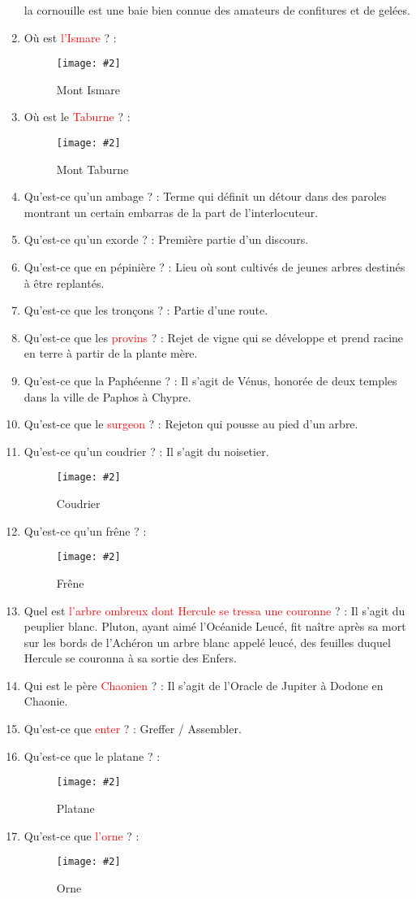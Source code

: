 \documentclass[a4paper, 11pt, hidelinks]{article}
\newcommand{\img}[4]{\begin{figure}[!ht]
    \centering
    \texttt{[image: \#2]}
    \caption{#3}
    \label{#4}
    \end{figure} }
\begin{document}
\begin{enumerate}
            la cornouille est une baie bien connue des amateurs de confitures et de gelées.
      \item Où est \textcolor{red}{l'Ismare} ? :
            \img{0.3}{Ismare.png}{Mont Ismare}{56}
      \item Où est le \textcolor{red}{Taburne} ? :
            \img{0.3}{Taburne.png}{Mont Taburne}{57}
      \item Qu'est-ce qu'un ambage ? : Terme qui définit un détour dans des paroles montrant un certain embarras de la
            part de l'interlocuteur.
      \item Qu'est-ce qu'un exorde ? : Première partie d'un discours.
      \item Qu'est-ce que en pépinière ? : Lieu où sont cultivés de jeunes arbres destinés à être replantés.
      \item Qu'est-ce que les tronçons ? : Partie d'une route.
      \item Qu'est-ce que les \textcolor{red}{provins} ? : Rejet de vigne qui se développe et prend racine en terre à partir de la plante mère.
      \item Qu'est-ce que la Paphéenne ? : Il s'agit de Vénus, honorée de deux temples dans la ville de Paphos à Chypre.
      \item Qu'est-ce que le \textcolor{red}{surgeon} ? : Rejeton qui pousse au pied d'un arbre.
      \item Qu'est-ce qu'un coudrier ? : Il s'agit du noisetier.
            \img{0.5}{coudrier.jpg}{Coudrier}{58}
            \newpage
      \item Qu'est-ce qu'un frêne ? :
            \img{0.5}{frene.jpg}{Frêne}{59}
      \item Quel est \textcolor{red}{l'arbre ombreux dont Hercule se tressa une couronne} ? : Il s'agit du peuplier blanc. Pluton, ayant aimé l'Océanide
            Leucé, fit naître après sa mort sur les bords de l'Achéron un arbre blanc appelé leucé, des feuilles duquel Hercule se couronna
            à sa sortie des Enfers.
      \item Qui est le père \textcolor{red}{Chaonien} ? : Il s'agit de l'Oracle de Jupiter à Dodone en Chaonie.
      \item Qu'est-ce que \textcolor{red}{enter} ? : Greffer / Assembler.
      \item Qu'est-ce que le platane ? :
            \img{0.5}{platane.jpg}{Platane}{60}
      \item Qu'est-ce que \textcolor{red}{l'orne} ? :
            \img{0.5}{orne.jpg}{Orne}{61}

\end{enumerate}
\end{document}
